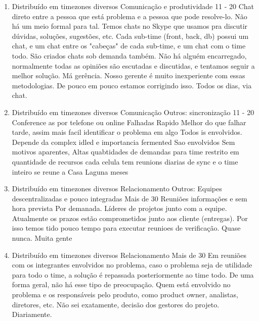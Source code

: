 \begin{enumerate}[leftmargin=0.5em]
	\item
	\begin{respostas3}
		{Distribuído em timezones diversos}
		{Comunicação e produtividade}
		{11 - 20}
		{Chat direto entre a pessoa que está problema e a pessoa que pode resolve-lo.}
		{Não há um meio formal para tal. Temos chats no Skype que usamos pra discutir dúvidas, soluções, sugestões, etc. Cada sub-time (front, back, db) possui um chat, e um chat entre os "cabeças" de cada sub-time, e um chat com o time todo. São criados chats sob demanda também.}
		{Não há alguém encarregado, normalmente todas as opiniões são escutadas e discutidas, e tentamos seguir a melhor solução.}
		{Má gerência. Nosso gerente é muito inexperiente com essas metodologias. De pouco em pouco estamos corrigindo isso.}
		{Todos os dias, via chat.}
	\end{respostas3}

	\item
	\begin{respostas3}
		{Distribuído em timezones diversos}
		{Comunicação \newline Outros: sincronização}
		{11 - 20}
		{Conference as por telefone ou online}
		{Falhadas Rapido Melhor do que falhar tarde, assim mais facil identificar o problema em algo}
		{Todos is envolvidos. Depende da complex idled e importancia fermented Sao envolvidos}
		{Sem motivos aparentes, Altas quabtidades de demandas para time restrito em quantidade de recursos}
		{cada celula tem reunions diarias de sync e o time inteiro se reune a Casa Laguna meses}
	\end{respostas3}

	\item
	\begin{respostas3}
		{Distribuído em timezones diversos}
		{Relacionamento \newline Outros: Equipes descentralizadas e pouco integradas}
		{Mais de 30}
		{Reuniões informações e sem hora prevista}
		{Por demanada.}
		{Líderes de projetos junto com a equipe.}
		{Atualmente os prazos estão comprometidos junto aos cliente (entregas). Por isso temos tido pouco tempo para executar reunioes de verificação.}
		{Quase nunca. Muita gente}
	\end{respostas3}

	\item
	\begin{respostas3}
		{Distribuído em timezones diversos}
		{Relacionamento}
		{Mais de 30}
		{Em reuniões com os integrantes envolvidos no problema, caso o problema seja de utilidade para todo o time, a solução é repassada posteriormente ao time todo.}
		{De uma forma geral, não há esse tipo de preocupação.}
		{Quem está envolvido no problema e os responsáveis pelo produto, como product owner, analistas, diretores, etc.}
		{Não sei exatamente, decisão dos gestores do projeto.}
		{Diariamente.}
	\end{respostas3}


\end{enumerate}
